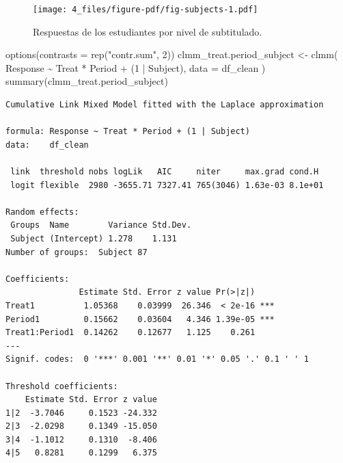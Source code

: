 \documentclass[
  12pt,
  a4paper,
  extrafontsizes,
  onecolumn,
  openright,
  table]{memoir}
\newenvironment{Shaded}{\begin{snugshade}}{\end{snugshade}}
\newcommand{\AttributeTok}[1]{\textcolor[rgb]{0.40,0.45,0.13}{#1}}
\newcommand{\DecValTok}[1]{\textcolor[rgb]{0.68,0.00,0.00}{#1}}
\newcommand{\FunctionTok}[1]{\textcolor[rgb]{0.28,0.35,0.67}{#1}}
\newcommand{\NormalTok}[1]{\textcolor[rgb]{0.00,0.23,0.31}{#1}}
\newcommand{\OtherTok}[1]{\textcolor[rgb]{0.00,0.23,0.31}{#1}}
\newcommand{\SpecialCharTok}[1]{\textcolor[rgb]{0.37,0.37,0.37}{#1}}
\newcommand{\StringTok}[1]{\textcolor[rgb]{0.13,0.47,0.30}{#1}}
\begin{document}
\scriptsize

\begin{figure}[h]

{\centering \texttt{[image: 4\_files/figure-pdf/fig-subjects-1.pdf]}

}

\caption{\label{fig-subjects}Respuestas de los estudiantes por nivel de
subtitulado.}

\end{figure}

\normalsize

\scriptsize

\begin{Shaded}
\begin{Highlighting}[]
\FunctionTok{options}\NormalTok{(}\AttributeTok{contrasts =} \FunctionTok{rep}\NormalTok{(}\StringTok{"contr.sum"}\NormalTok{, }\DecValTok{2}\NormalTok{))}
\NormalTok{clmm\_treat.period\_subject }\OtherTok{\textless{}{-}} \FunctionTok{clmm}\NormalTok{(}
\NormalTok{    Response }\SpecialCharTok{\textasciitilde{}}\NormalTok{ Treat }\SpecialCharTok{*}\NormalTok{ Period }\SpecialCharTok{+}\NormalTok{ (}\DecValTok{1} \SpecialCharTok{|}\NormalTok{ Subject),}
    \AttributeTok{data =}\NormalTok{ df\_clean}
\NormalTok{)}
\FunctionTok{summary}\NormalTok{(clmm\_treat.period\_subject)}
\end{Highlighting}
\end{Shaded}

\begin{verbatim}
Cumulative Link Mixed Model fitted with the Laplace approximation

formula: Response ~ Treat * Period + (1 | Subject)
data:    df_clean

 link  threshold nobs logLik   AIC     niter     max.grad cond.H 
 logit flexible  2980 -3655.71 7327.41 765(3046) 1.63e-03 8.1e+01

Random effects:
 Groups  Name        Variance Std.Dev.
 Subject (Intercept) 1.278    1.131   
Number of groups:  Subject 87 

Coefficients:
               Estimate Std. Error z value Pr(>|z|)    
Treat1          1.05368    0.03999  26.346  < 2e-16 ***
Period1         0.15662    0.03604   4.346 1.39e-05 ***
Treat1:Period1  0.14262    0.12677   1.125    0.261    
---
Signif. codes:  0 '***' 0.001 '**' 0.01 '*' 0.05 '.' 0.1 ' ' 1

Threshold coefficients:
    Estimate Std. Error z value
1|2  -3.7046     0.1523 -24.332
2|3  -2.0298     0.1349 -15.050
3|4  -1.1012     0.1310  -8.406
4|5   0.8281     0.1299   6.375
\end{verbatim}
\end{document}
